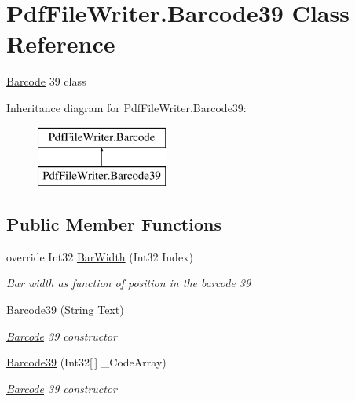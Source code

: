 \hypertarget{class_pdf_file_writer_1_1_barcode39}{}\section{Pdf\+File\+Writer.\+Barcode39 Class Reference}
\label{class_pdf_file_writer_1_1_barcode39}


\hyperlink{class_pdf_file_writer_1_1_barcode}{Barcode} 39 class  


Inheritance diagram for Pdf\+File\+Writer.\+Barcode39\+:\begin{figure}[H]
\begin{center}
\leavevmode
\includegraphics[height=2.000000cm]{class_pdf_file_writer_1_1_barcode39}
\end{center}
\end{figure}
\subsection*{Public Member Functions}
\begin{DoxyCompactItemize}
\item 
override Int32 \hyperlink{class_pdf_file_writer_1_1_barcode39_a1a9e163d65af7de251f4cc711e2a0ddb}{Bar\+Width} (Int32 Index)
\begin{DoxyCompactList}\small\item\em Bar width as function of position in the barcode 39 \end{DoxyCompactList}\item 
\hyperlink{class_pdf_file_writer_1_1_barcode39_aa21f79bcde00e5c7ccfe0d6c68ec819b}{Barcode39} (String \hyperlink{class_pdf_file_writer_1_1_barcode_a1fe2157662e4a1b52264823a382fde3f}{Text})
\begin{DoxyCompactList}\small\item\em \hyperlink{class_pdf_file_writer_1_1_barcode}{Barcode} 39 constructor \end{DoxyCompactList}\item 
\hyperlink{class_pdf_file_writer_1_1_barcode39_a8b7f93f3cc76357f1ecf392cd2c12fb3}{Barcode39} (Int32\mbox{[}$\,$\mbox{]} \+\_\+\+Code\+Array)
\begin{DoxyCompactList}\small\item\em \hyperlink{class_pdf_file_writer_1_1_barcode}{Barcode} 39 constructor \end{DoxyCompactList}\end{DoxyCompactItemize}
